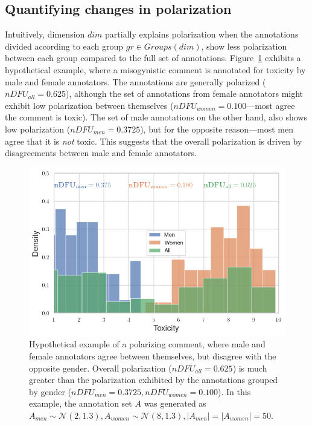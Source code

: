\documentclass{article}
\newcommand{\sdbdim}{\textit{dim}}
\newcommand{\sdbgroup}{\textit{gr}}
\newcommand{\Sdbgroup}{\textit{Groups}}
\begin{document}
\subsection{Quantifying changes in polarization}
\label{ssec:methodology:intuition}

Intuitively, dimension $\sdbdim$ partially explains polarization when the annotations divided according to each group $\sdbgroup \in \Sdbgroup(\sdbdim)$, show less polarization between each group compared to the full set of annotations. Figure~\ref{fig:ndfu_single_comment} exhibits a hypothetical example, where a misogynistic comment is annotated for toxicity by male and female annotators. The annotations are generally polarized ($nDFU_{all} = 0.625$), although the set of annotations from female annotators might exhibit low polarization between themselves ($nDFU_{women} = 0.100$---most agree the comment is toxic). The set of male annotations on the other hand, also shows low polarization ($nDFU_{men} = 0.3725$), but for the opposite reason---most men agree that it is \emph{not} toxic. This suggests that the overall polarization is driven by disagreements between male and female annotators. 

\begin{figure}
	\centering
	\includegraphics[width=0.8\linewidth]{ndfu_single_comment.png}
	\caption{Hypothetical example of a polarizing comment, where male and female annotators agree between themselves, but disagree with the opposite gender. Overall polarization ($nDFU_{all} = 0.625$) is much greater than the polarization exhibited by the annotations grouped by gender ($nDFU_{men} = 0.3725, nDFU_{women} = 0.100$). In this example, the annotation set $A$ was generated as $A_{men} \sim \mathcal{N}(2, 1.3), A_{women} \sim \mathcal{N}(8, 1.3), \lvert A_{men} \rvert = \lvert A_{women} \rvert = 50$.}
	\label{fig:ndfu_single_comment}
\end{figure}
\end{document}
